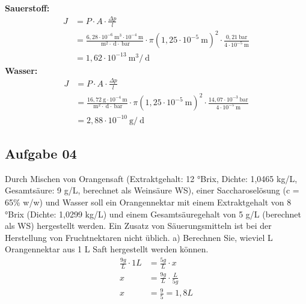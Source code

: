 \documentclass[a4paper,10pt]{article}
\begin{document}
\pp 
\textbf{Sauerstoff:}
\begin{align*}
J &= P \cdot A \cdot \frac{\Delta p}{l} \\
 &= \frac{6,28 \cdot 10^{-6}~\text{m}^3 \cdot 10^{-4} ~\text{m}}{~\text{m}^2 \cdot ~\text{d} \cdot ~\text{bar}} \cdot \pi  \left( 1,25 \cdot 10^{-5}~\text{m} \right)^2  \cdot \frac{0,21 ~\text{bar}}{4 \cdot 10^{-5} ~\text{m}} \\
  &= 1,62 \cdot 10^{-13} ~\text{m}^3 / ~\text{d}
\end{align*}
\pp 
\textbf{Wasser:}
\begin{align*}
J &= P \cdot A \cdot \frac{\Delta p}{l} \\
 &= \frac{16,72 ~\text{g}  \cdot 10^{-4} ~\text{m}}{~\text{m}^2 \cdot ~\text{d} \cdot ~\text{bar}} \cdot \pi  \left( 1,25 \cdot 10^{-5}~\text{m} \right)^2  \cdot \frac{14,07 \cdot 10^{-3} ~\text{bar}}{4 \cdot 10^{-5} ~\text{m}} \\
  &= 2,88 \cdot 10^{-10} ~\text{g} / ~\text{d}
\end{align*}

\pagebreak

\subsection*{Aufgabe 04}
Durch Mischen von Orangensaft (Extraktgehalt: 12 °Brix, Dichte: 1,0465 kg/L, Gesamtsäure: 9
g/L, berechnet als Weinsäure WS), einer Saccharoselösung (c = 65\% w/w) und Wasser soll ein
Orangennektar mit einem Extraktgehalt von 8 °Brix (Dichte: 1,0299 kg/L) und einem
Gesamtsäuregehalt von 5 g/L (berechnet als WS) hergestellt werden. Ein Zusatz von
Säuerungsmitteln ist bei der Herstellung von Fruchtnektaren nicht üblich.
\pp
a) Berechnen Sie, wieviel L Orangennektar aus 1 L Saft hergestellt werden können.
\begin{align*}
\frac{9g}{L} \cdot 1 L &= \frac{5g}{L} \cdot x  \\
x &= \frac{9g}{L} \cdot \frac{L}{5g} \\
x &= \frac{9}{5} = 1,8 L
\end{align*}
\end{document}

